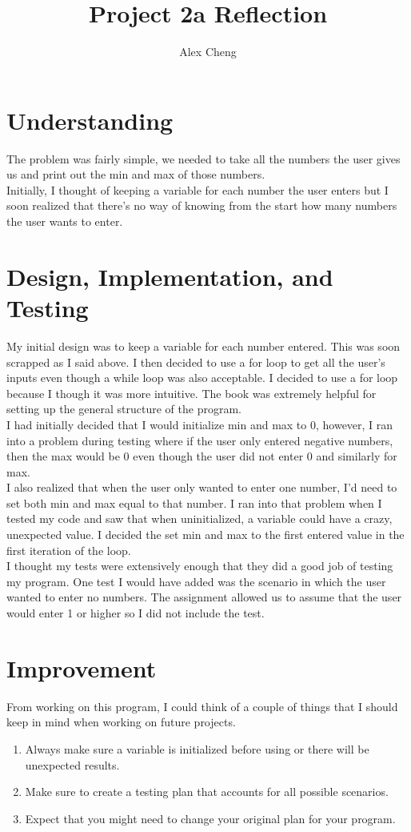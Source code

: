 \documentclass[]{article}
\title{Project 2a Reflection}
\author{Alex Cheng}
\begin{document}
\maketitle
\section{Understanding}
The problem was fairly simple, we needed to take all the numbers the user gives us and print out the min and max of those numbers. \\ 

Initially, I thought of keeping a variable for each number the user enters but I soon realized that there's no way of knowing from the start how many numbers the user wants to enter.

\section{Design, Implementation, and Testing}
My initial design was to keep a variable for each number entered. This was soon scrapped as I said above. I then decided to use a for loop to get all the user's inputs even though a while loop was also acceptable. I decided to use a for loop because I though it was more intuitive. The book was extremely helpful for setting up the general structure of the program. \\  

I had initially decided that I would initialize min and max to 0, however, I ran into a problem during testing where if the user only entered negative numbers, then the max would be 0 even though the user did not enter 0 and similarly for max. \\ 

I also realized that when the user only wanted to enter one number, I'd need to set both min and max equal to that number. I ran into that problem when I tested my code and saw that when uninitialized, a variable could have a crazy, unexpected value. I decided the set min and max to the first entered value in the first iteration of the loop.\\ 

I thought my tests were extensively enough that they did a good job of testing my program. One test I would have added was the scenario in which the user wanted to enter no numbers. The assignment allowed us to assume that the user would enter 1 or higher so I did not include the test.

\section{Improvement}
From working on this program, I could think of a couple of things that I should keep in mind when working on future projects. 
\begin{enumerate}
	\item Always make sure a variable is initialized before using or there will be unexpected results.
	\item Make sure to create a testing plan that accounts for all possible scenarios.
	\item Expect that you might need to change your original plan for your program.
\end{enumerate}
\end{document}
